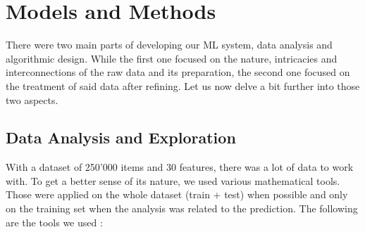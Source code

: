 \documentclass[10pt,conference,compsocconf]{IEEEtran}
\begin{document}
\section{Models and Methods}
\label{sec:mod_meth}

There were two main parts of developing our ML system, data analysis and algorithmic design. While the first one focused on the nature, intricacies and interconnections of the raw data and its preparation, the second one focused on the treatment of said data after refining. Let us now delve a bit further into those two aspects.

\subsection{Data Analysis and Exploration}
With a dataset of 250'000 items and 30 features, there was a lot of data to work with. To get a better sense of its nature, we used various mathematical tools. Those were applied on the whole dataset (train + test) when possible and only on the training set when the analysis was related to the prediction. The following are the tools we used :
\end{document}
